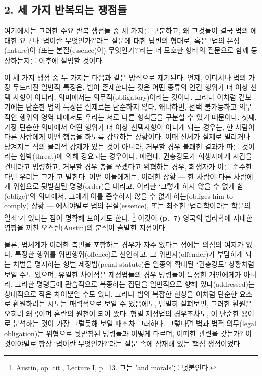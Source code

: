 \subsection{2. 세 가지 반복되는
쟁점들}\label{uxc138-uxac00uxc9c0-uxbc18uxbcf5uxb418uxb294-uxc7c1uxc810uxb4e4}

여기에서는 그러한 주요 반복 쟁점들 중 세 가지를 구분하고, 왜 그것들이
결국 법의 에 대한 요구나 ‘법이란 무엇인가?’라는
질문에 대한 답변의 형태로, 혹은 ‘법의 본성(nature)이 (또는
본질(essence)이) 무엇인가?’라는 더 모호한 형태의 질문으로 함께
등장하는지를 이후에 설명할 것이다.

이 세 가지 쟁점 중 두 가지는 다음과 같은 방식으로 제기된다. 언제,
어디서나 법의 가장 두드러진 일반적 특징은, 법이 존재한다는 것은 어떤
종류의 인간 행위가 더 이상 선택 사항이 아니라, 
의미에서는 의무적(obligatory)이라는 것이다. 그러나 이처럼 겉보기에는
단순한 법의 특징은 실제로는 단순하지 않다. 왜냐하면, 선택 불가능하고
의무적인 행위의 영역 내에서도 우리는 서로 다른 형식들을 구분할 수 있기
때문이다. 첫째, 가장 단순한 의미에서 어떤 행위가 더 이상 선택사항이
아니게 되는 경우는, 한 사람이 다른 사람에게 어떤 행동을 하도록 강요하는
상황이다. 이때 신체가 실제로 밀리거나 당겨지는 식의 물리적 강제가 있는
것이 아니라, 거부할 경우 불쾌한 결과가 따를 것이라는 협박(threat)에 의해
강요되는 경우이다. 예컨대, 권총강도가 희생자에게 지갑을 건네라고
명령하고, 거부할 경우 총을 쏘겠다고 위협하는 경우, 희생자가 이를
준수한다면 우리는 그가 고
말한다. 어떤 이들에게는, 이러한 상황 --- 한 사람이 다른 사람에게
위협으로 뒷받침된 명령(order)을 내리고, 이러한 ‘그렇게 하지 않을 수 없게
함(oblige)’의 의미에서, 그에게 이를 준수하지 않을 수 없게 하는(obliges
him to comply) 상황 --- 에서야말로 법의 본질(essence), 또는 최소한
‘법리학이라는 학문의 열쇠’가 있다는 점이 명확해 보이기도 한다.
\footnote{Austin, op. cit., Lecture I, p.~13. 그는 'and morals'를
  덧붙인다.} 이것이 \textbf{(p.~7)} 영국의 법리학에 지대한 영향을 끼친
오스틴(Austin)의 분석이 출발한 지점이다.

물론, 법체계가 이러한 측면을 포함하는 경우가 자주 있다는 점에는 의심의
여지가 없다. 특정한 행위를 위반행위(offence)로 선언하고, 그
위반자(offender)가 부담하게 되는 처벌을 명시하는 형벌 제정법(penal
statute)은 일종의 확대된 ‘권총강도’ 상황처럼 보일 수도 있으며, 유일한
차이점은 제정법들의 경우 명령들이 특정한 개인에게가 아니라, 그러한
명령들에 관습적으로 복종하는 집단을 일반적으로 향해 있다(addressed)는
상대적으로 작은 차이뿐일 수도 있다. 그러나 법의 복잡한 현상을 이처럼
단순한 요소로 환원하려는 시도는 매력적으로 보일 수 있음에도, 면밀히
살펴보면, 그러한 환원은 오히려 왜곡이며 혼란의 원천이 되어 왔다. 형벌
제정법의 경우조차도, 이 단순한 용어로 분석하는 것이 가장 그럴듯해 보일
때조차 그러하다. 그렇다면 법과 법적 의무(legal obligation)는 위협으로
뒷받침된 명령들과 어떻게 다르며, 어떠한 관련을 갖는가? 이것이야말로 항상
‘법이란 무엇인가?’라는 질문 속에 잠재해 있는 핵심 쟁점이었다.

